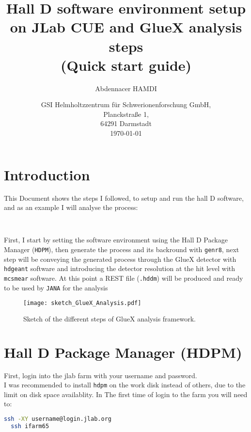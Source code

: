 \documentclass{article}
\title{Hall D software environment setup on JLab CUE and GlueX analysis steps \\ (Quick start guide)}
\author{Abdennacer HAMDI}
\date{%
GSI Helmholtzzentrum f\"ur Schwerionenforschung GmbH,\\%
Planckstraße 1,\\%
64291 Darmstadt \\%
\today}
\begin{document}
\fontsize{11}{11}
\selectfont
\maketitle

\section{Introduction}
This Document shows the steps I followed, to setup and run the hall D software, and as an example I will analyse the process: 

\begin{center}
\end{center}

~\par First, I start by setting the software environment using the Hall D Package Manager (\texttt{HDPM}), then generate the process and its backround with \texttt{genr8}, next step will be conveying the generated process through the GlueX detector with \texttt{hdgeant} software and introducing the detector resolution at the hit level with \texttt{mcsmear} software. At this point a REST file (\texttt{.hddm}) will be produced and ready to be used by \texttt{JANA} for the analysis %

\begin{figure}[h]
  \centering
  \texttt{[image: sketch\_GlueX\_Analysis.pdf]}
  \caption{Sketch of the different steps of GlueX analysis framework.}
  \label{fig:1}
\end{figure}

\section{Hall D Package Manager (HDPM)}

First, login into the jlab farm with your username and password.\\
I was recommended to install \texttt{hdpm} on the work disk instead of others, due to the limit on disk space availablity.
In The first time of login to the farm you will need to:

\begin{lstlisting}[language=bash]
  ssh -XY username@login.jlab.org
  ssh ifarm65
\end{lstlisting}
\end{document}
